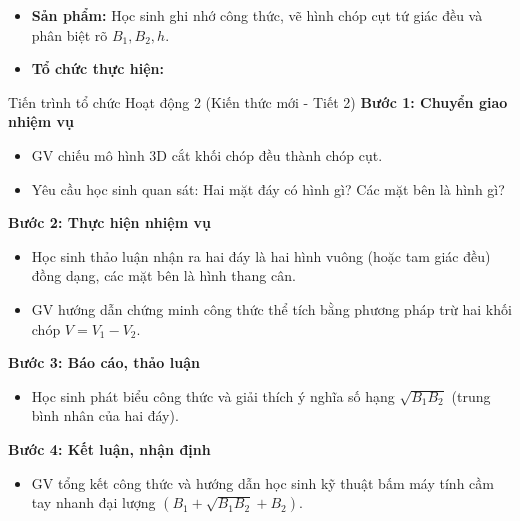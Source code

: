 \documentclass[12pt, a4paper]{article}
\begin{document}
\begin{itemize}[leftmargin=1.2cm]
    \item[c)] \textbf{Sản phẩm:} Học sinh ghi nhớ công thức, vẽ hình chóp cụt tứ giác đều và phân biệt rõ $B_1, B_2, h$.
    \item[d)] \textbf{Tổ chức thực hiện:}
\end{itemize}

\begin{pedabox}{Tiến trình tổ chức Hoạt động 2 (Kiến thức mới - Tiết 2)}
    \textbf{Bước 1: Chuyển giao nhiệm vụ}
    \begin{itemize}[leftmargin=0.6cm]
        \item GV chiếu mô hình 3D cắt khối chóp đều thành chóp cụt.
        \item Yêu cầu học sinh quan sát: Hai mặt đáy có hình gì? Các mặt bên là hình gì?
    \end{itemize}

    \textbf{Bước 2: Thực hiện nhiệm vụ}
    \begin{itemize}[leftmargin=0.6cm]
        \item Học sinh thảo luận nhận ra hai đáy là hai hình vuông (hoặc tam giác đều) đồng dạng, các mặt bên là hình thang cân.
        \item GV hướng dẫn chứng minh công thức thể tích bằng phương pháp trừ hai khối chóp $V = V_1 - V_2$.
    \end{itemize}

    \textbf{Bước 3: Báo cáo, thảo luận}
    \begin{itemize}[leftmargin=0.6cm]
        \item Học sinh phát biểu công thức và giải thích ý nghĩa số hạng $\sqrt{B_1 B_2}$ (trung bình nhân của hai đáy).
    \end{itemize}

    \textbf{Bước 4: Kết luận, nhận định}
    \begin{itemize}[leftmargin=0.6cm]
        \item GV tổng kết công thức và hướng dẫn học sinh kỹ thuật bấm máy tính cầm tay nhanh đại lượng $\left( B_1 + \sqrt{B_1 B_2} + B_2 \right)$.
    \end{itemize}
\end{pedabox}
\end{document}
